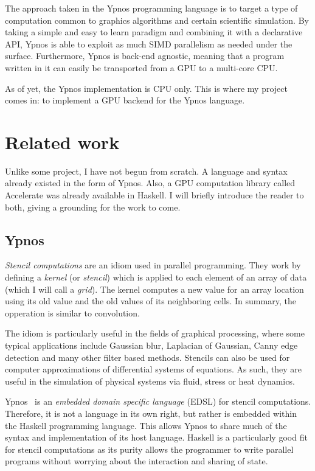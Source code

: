\documentclass[12pt,a4paper,oneside]{scrbook}
\begin{document}
The approach taken in the Ypnos programming language is to target a type of
computation common to graphics algorithms and certain scientific simulation. By
taking a simple and easy to learn paradigm and combining it with a declarative
API, Ypnos is able to exploit as much SIMD parallelism as needed under the
surface. Furthermore, Ypnos is back-end agnostic, meaning that a program written
in it can easily be transported from a GPU to a multi-core CPU.

As of yet, the Ypnos implementation is CPU only. This is where my project comes
in: to implement a GPU backend for the Ypnos language.

\section{Related work}

Unlike some project, I have not begun from scratch. A language and syntax
already existed in the form of Ypnos. Also, a GPU computation library called
Accelerate was already available in Haskell. I will briefly introduce the reader to
both, giving a grounding for the work to come.

\subsection{Ypnos}

\emph{Stencil computations} are an idiom used in parallel programming.  They
work by defining a \emph{kernel} (or \emph{stencil}) which is applied to each
element of an array of data (which I will call a \emph{grid}). The kernel
computes a new value for an array location using its old value and the old
values of its neighboring cells. In summary, the opperation is similar to
convolution.

The idiom is particularly useful in the fields of graphical processing, where
some typical applications include Gaussian blur, Laplacian of Gaussian, Canny
edge detection and many other filter based methods.  Stencils can also be used
for computer approximations of differential systems of equations. As such, they
are useful in the simulation of physical systems via fluid, stress or heat
dynamics.

Ypnos~\cite{ypnos-damp10, ypnos-dsl11} is an \emph{embedded domain specific
  language} (EDSL) for stencil computations. Therefore, it is not a language in
its own right, but rather is embedded within the Haskell programming
language. This allows Ypnos to share much of the syntax and implementation of
its host language. Haskell is a particularly good fit for stencil computations
as its purity allows the programmer to write parallel programs without worrying
about the interaction and sharing of state.
\end{document}
